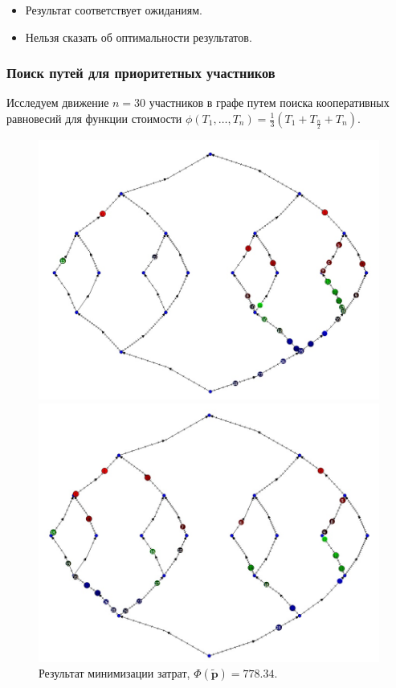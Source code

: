 \documentclass{beamer}
\begin{document}
\begin{frame}
\begin{itemize}
	\item Результат соответствует ожиданиям.
	\item Нельзя сказать об оптимальности результатов.
\end{itemize}

\end{frame}


\begin{frame}\frametitle{Поиск путей для приоритетных участников}
Исследуем движение $n = 30$ участников в графе путем поиска кооперативных равновесий для функции стоимости $\phi(T_1, \ldots, T_n) = \frac{1}{3} \left(T_1 + T_{\frac{n}{2}} + T_n\right)$.
\begin{figure}[H]
	\begin{center}
		\begin{minipage}[h]{0.35\linewidth}
			\includegraphics[width=1\linewidth]{imgs/prior_good.jpg}
			\caption{Результат минимизации затрат, $\Phi(\widetilde{\textbf{p}}) = 778.34$.}
		\end{minipage}
		\hfill
		\begin{minipage}[h]{0.35\linewidth}
			\includegraphics[width=1\linewidth]{imgs/prior_bad.jpg}

\end{minipage}
\end{center}
\end{figure}
\end{frame}
\end{document}
